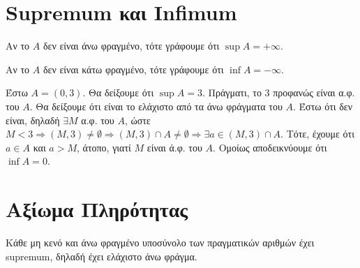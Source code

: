 \documentclass[main.tex]{subfiles}
\begin{document}
\section{Supremum και Infimum}



\begin{rem}
\item {}
  \begin{myitemize}
    \item Αν το $A$ δεν είναι άνω φραγμένο, τότε γράφουμε ότι $ \sup A = 
      + \infty $.
    \item Αν το $A$ δεν είναι κάτω φραγμένο, τότε γράφουμε ότι $ \inf A = 
      - \infty $.
  \end{myitemize}
\end{rem}

\begin{example}
  Έστω $ A = (0,3) $. Θα δείξουμε ότι $ \sup A = 3 $. Πράγματι, 
  το $ 3 $ προφανώς είναι α.φ. του $A$. Θα δείξουμε ότι είναι το
  ελάχιστο από τα άνω φράγματα του $A$. Έστω ότι δεν είναι, δηλαδή 
  $ \exists M $ α.φ. του $A$, ώστε $ M < 3 \Rightarrow (M,3) \neq 
  \emptyset \Rightarrow (M,3) \cap A \neq \emptyset \Rightarrow \exists 
  a \in (M,3) \cap A $. Τότε, έχουμε ότι $ a \in A $ και $ a > M $, 
  άτοπο, γιατί $M$ είναι ά.φ. του $A$. Ομοίως αποδεικνύουμε ότι $ 
  \inf A = 0$.
\end{example}

\section{Αξίωμα Πληρότητας}

Κάθε μη κενό και άνω φραγμένο υποσύνολο των πραγματικών αριθμών έχει 
supremum, δηλαδή έχει ελάχιστο άνω φράγμα.

\end{document}
